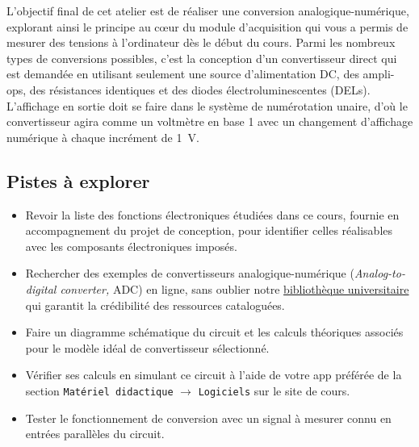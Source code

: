\documentclass[canadien,12pt,oneside,letterpaper]{article}
\begin{document}
L'objectif final de cet atelier est de réaliser une conversion analogique-numérique, explorant ainsi le principe au cœur du module d'acquisition qui vous a permis de mesurer des tensions à l'ordinateur dès le début du cours. Parmi les nombreux types de conversions possibles, c'est la conception d'un convertisseur direct qui est demandée en utilisant seulement une source d'alimentation DC, des ampli-ops, des résistances identiques et des diodes électroluminescentes (DELs). L'affichage en sortie doit se faire dans le système de numérotation unaire, d'où le convertisseur agira comme un voltmètre en base 1 avec un changement d'affichage numérique à chaque incrément de 1~V.



\subsection{Pistes à explorer}
\begin{itemize}
    \item Revoir la liste des fonctions électroniques étudiées dans ce cours, fournie en accompagnement du projet de conception, pour identifier celles réalisables avec les composants électroniques imposés. %
    \item Rechercher des exemples de convertisseurs analogique-numérique (\textit{Analog-to-digital converter,} ADC) en ligne, sans oublier notre \href{https://www.bibl.ulaval.ca}{bibliothèque universitaire} qui garantit la crédibilité des ressources cataloguées.
    \item Faire un diagramme schématique du circuit et les calculs théoriques associés pour le modèle idéal de convertisseur sélectionné.
    \item Vérifier ses calculs en simulant ce circuit à l'aide de votre app préférée de la section \texttt{Matériel didactique} $\rightarrow$ \texttt{Logiciels} sur le site de cours.
    \item Tester le fonctionnement de conversion avec un signal à mesurer connu en entrées parallèles du circuit.
\end{itemize}
\end{document}
